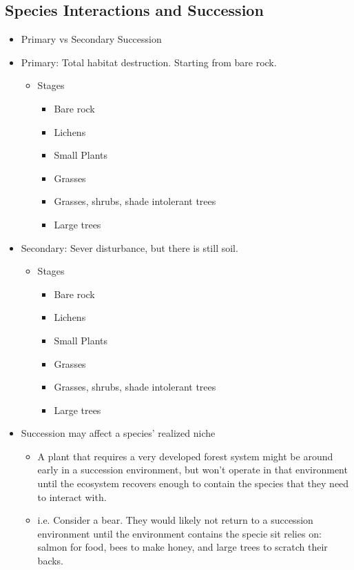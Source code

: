 \documentclass[12pt]{article}
\begin{document}
\subsection{Species Interactions and Succession}

\begin{itemize}
    \item Primary vs Secondary Succession
    \item Primary: Total habitat destruction. Starting from bare rock.
          \begin{itemize}
              \item Stages
                    \begin{itemize}
                        \item Bare rock
                        \item Lichens
                        \item Small Plants
                        \item Grasses
                        \item Grasses, shrubs, shade intolerant trees
                        \item Large trees
                    \end{itemize}
          \end{itemize}

    \item Secondary: Sever disturbance, but there is still soil.
          \begin{itemize}
              \item Stages
                    \begin{itemize}
                        \item Bare rock
                        \item Lichens
                        \item Small Plants
                        \item Grasses
                        \item Grasses, shrubs, shade intolerant trees
                        \item Large trees
                    \end{itemize}
          \end{itemize}
    \item Succession may affect a species' realized niche
          \begin{itemize}
              \item A plant that requires a very developed forest system might be around early in a succession environment, but won't operate in that environment until the ecosystem recovers enough to contain the species that they need to interact with.
              \item i.e. Consider a bear. They would likely not return to a succession environment until the environment contains the specie sit relies on: salmon for food, bees to make honey, and large trees to scratch their backs.
          \end{itemize}
\end{itemize}
\end{document}
